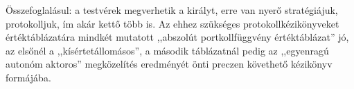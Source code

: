 \documentclass{article}
\newcommand{\blk}{\cellcolor{darkgray}}
\newcommand{\red}{\cellcolor{red!33}}
\newcommand{\grn}{\cellcolor{green!33}}
\newcommand{\just}[1]{\boxed{#1}}%
\newcommand{\incl}{\mathbf{incl}}
\newcommand{\excl}{\mathbf{excl}}
\begin{document}
\begin{comment}
				               &  2                        &    \blk           & \blk           & \red\just\excl & \grn\just\incl & \blk           & \blk           \\\cline{2-8}
				               &  3                        &    \blk           & \blk           & \red\just\excl & \grn\just\incl & \blk           & \blk           \\\hline\hline
			\multirow{4}{*}{3}     &  0                        &    \blk           & \blk           & \blk           & \blk           & \blk           & \blk           \\\cline{2-8}
				               &  1                        &    \blk           & \blk           & \blk           & \blk           & \blk           & \blk           \\\cline{2-8}
				               &  2                        &    \blk           & \blk           & \blk           & \blk           & \blk           & \blk           \\\cline{2-8}
				               &  3                        &    \blk           & \blk           & \blk           & \blk           & \blk           & \blk           \\\hline
		\end{tabular}
	\end{table}

	\end{comment}

	Összefoglalásul: a testvérek megverhetik a királyt, erre van nyerő stratégiájuk, protokolljuk, ím akár kettő több is. Az ehhez szükséges protokollkézikönyveket értéktáblázatára mindkét mutatott ,,abszolút portkollfüggvény értéktáblázat'' jó, az elsőnél a ,,kísértetállomásos'', a második táblázatnál pedig az ,,egyenragú autonóm aktoros'' megközelítés eredményét önti preczen követhető kézikönyv formájába.
\end{document}
